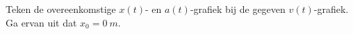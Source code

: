 
\begin{exercise}


\begin{minipage}[t]{.6\linewidth}
	Teken de overeenkomstige $x(t)$- en $a(t)$-grafiek bij de gegeven $v(t)$-grafiek. Ga ervan uit dat $x_0=\SI{0}{m}$.
\end{minipage}
\hfill
\begin{minipage}[t]{.37\linewidth}
	\raisebox{1ex-\height}{%
		\texttt{[image: v(t)]}%
		} 
\end{minipage}

\end{exercise}
